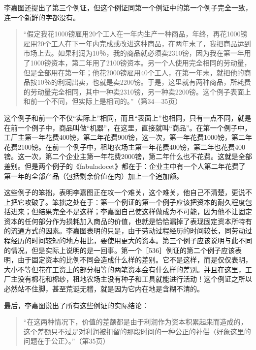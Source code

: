 李嘉图还提出了第三个例证，但这个例证同第一个例证中的第一个例子完全一致，连一个新鲜的字都没有。

\begin{quote}{“假定我花1000镑雇用20个工人在一年内生产一种商品，年终，再花1000镑雇用20个工人在下一年内完成或改进这种商品，在两年末了，我把商品运到市场上去。如果利润为10％，我的商品就必须卖2310镑，因为我在第一年用了1000镑资本，第二年用了2100镑资本。另一个人使用完全相同的劳动量，但是全部用在第一年；他花2000镑雇用40个工人，在第一年末，就把他的商品按10％的利润出卖，也就是卖2200镑。于是，这里就有两种商品，所耗费的劳动量完全相同，其中一种卖2310镑，另一种卖2200镑。这个例子表面上和前一个不同，但实际上是相同的。”（第34—35页）}\end{quote}

这个例子和前一个不仅“实际上”相同，而且“表面上”也相同，只有一点不同，就是在前一个例子中，商品叫做“机器”，在这里，直接就叫“商品”。在第一个例子中，工厂主第一年花费400镑，第二年花费900镑，这一次，第一年花费1000镑，第二年花费2100镑。在前一个例子中，租地农场主第一年花费400镑，第二年也花费400镑。这一次，第二个企业主第一年花费2000镑，第二年什么也不花费。这就是全部差别。但是两个例子的《fabuladocet》都在于：企业主中有一个人第二年花费了第一年的全部产品（包括剩余价值在内）加上一个追加额。

这些例子的笨拙，表明李嘉图正在攻一个难关，这个难关，他自己不清楚，更说不上把它攻破了。笨拙之处在于：第一个例证的第一个例子应该把资本的耐久程度包括进来；但结果完全不是这样；李嘉图自己使这样做成为不可能，因为他不让固定资本的任何部分作为损耗加入商品的价值，也就是恰恰漏掉了表现固定资本所特有的流通方式的因素。李嘉图表明的只是，由于劳动过程经历的时间较长，同劳动过程经历的时间较短的地方相比，要使用更大的资本。第三个例子应该说明与此不同的情况，但是实际上说明的是一回事。第一个［536］例证的第二个例子应该表明，由于固定资本的比例不同会造成什么样的差别。它不是这样，而是仅仅表明，大小不等但花在工资上的部分相等的两笔资本会有什么样的差别。并且在这里，工厂主没有棉花和棉纱，租地农场主没有种子和工具就能进行活动！这个例证之所以必然站不住脚，甚至荒诞无稽，就是因为它内在地是含糊不清的。


最后，李嘉图说出了所有这些例证的实际结论：

\begin{quote}{“在这两种情况下，价值的差额都是由于利润作为资本积累起来而造成的，这个差额只不过是对利润被扣留的那段时间的一种公正的补偿〈好象这里的问题在于公正〉。”（第35页）}\end{quote}

